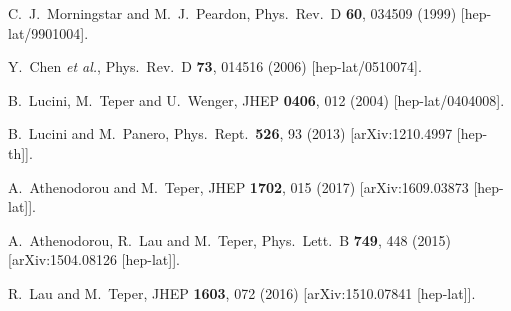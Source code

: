 \documentclass[prl,aps,
showpacs,
preprint,
nofootinbib,
floatfix,
superscriptaddress, showkeys
]{revtex4-1}
\begin{document}
\begin{thebibliography}{99}
  C.~J.~Morningstar and M.~J.~Peardon,
  Phys.\ Rev.\ D {\bf 60}, 034509 (1999)
  [hep-lat/9901004].
  
  
  
  Y.~Chen {\it et al.},
  Phys.\ Rev.\ D {\bf 73}, 014516 (2006)
  [hep-lat/0510074].
  
  B.~Lucini, M.~Teper and U.~Wenger,
  JHEP {\bf 0406}, 012 (2004)
  [hep-lat/0404008].
  
  B.~Lucini and M.~Panero,
  Phys.\ Rept.\  {\bf 526}, 93 (2013)
  [arXiv:1210.4997 [hep-th]].
 
  A.~Athenodorou and M.~Teper,
  JHEP {\bf 1702}, 015 (2017)
  [arXiv:1609.03873 [hep-lat]].
  
  A.~Athenodorou, R.~Lau and M.~Teper,
  Phys.\ Lett.\ B {\bf 749}, 448 (2015)
  [arXiv:1504.08126 [hep-lat]].
  
  R.~Lau and M.~Teper,
  JHEP {\bf 1603}, 072 (2016)
  [arXiv:1510.07841 [hep-lat]].
  

\end{thebibliography}
\end{document}
